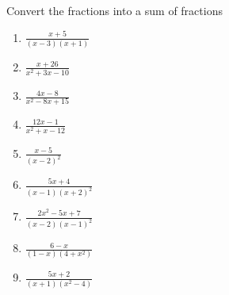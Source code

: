\documentclass[../main.tex]{subfiles}
\begin{document}
Convert the fractions into a sum of fractions
\begin{enumerate}[itemsep=1cm]
    \item 
    $\frac{x+5}{(x-3)(x+1)}$

    \item 
    $\frac{x+26}{x^2+3x-10}$

    \item 
    $\frac{4x-8}{x^2-8x+15}$

    \item 
    $\frac{12x-1}{x^2+x-12}$

    \item 
    $\frac{x-5}{(x-2)^2}$

    \item 
    $\frac{5x+4}{(x-1)(x+2)^2}$

    \item 
    $\frac{2x^2-5x+7}{(x-2)(x-1)^2}$

    \item 
    $\frac{6-x}{(1-x)(4+x^2)}$

    \item 
    $\frac{5x+2}{(x+1)(x^2-4)}$
\end{enumerate}
\end{document}
